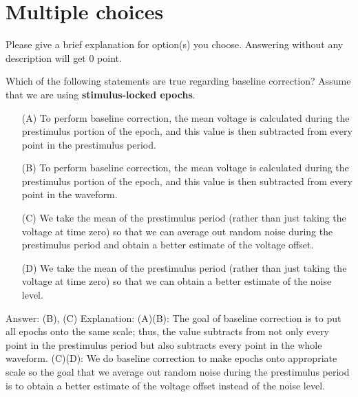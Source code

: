 \documentclass[a4 paper]{article}
\begin{document}
\section{Multiple choices}
Please give a brief explanation for option(s) you choose. Answering without any description will get 0 point.
\begin{tcolorbox}[colback=RubineRed!5!white,colframe=RubineRed!75!black]
Which of the following statements are true regarding baseline correction? Assume that we are using \textbf{stimulus-locked epochs}.
\begin{itemize}
    \item[(A)]To perform baseline correction, the mean voltage is calculated during the prestimulus portion of the epoch, and this value is then subtracted from every point in the prestimulus period.
    \item[(B)]To perform baseline correction, the mean voltage is calculated during the prestimulus portion of the epoch, and this value is then subtracted from every point in the waveform.
    \item[(C)]We take the mean of the prestimulus period (rather than just taking the voltage at time zero) so that we can average out random noise during the prestimulus period and obtain a better estimate of the voltage offset.
    \item[(D)]We take the mean of the prestimulus period (rather than just taking the voltage at time zero) so that we can obtain a better estimate of the noise level.
\end{itemize}
\end{tcolorbox}
\begin{tcolorbox}[colback=YellowGreen!5!white,colframe=YellowGreen!75!black,title={Problem 7's answer}]
Answer: (B), (C)\newline
Explanation:\newline
(A)(B): The goal of baseline correction is to put all epochs onto the same scale; thus, the value subtracts from not only every point in the prestimulus period but also subtracts every point in the whole waveform.\newline
(C)(D): We do baseline correction to make epochs onto appropriate scale so the goal that we average out random noise during the prestimulus period is to obtain a better estimate of the voltage offset instead of the noise level.
\end{tcolorbox}
\end{document}
